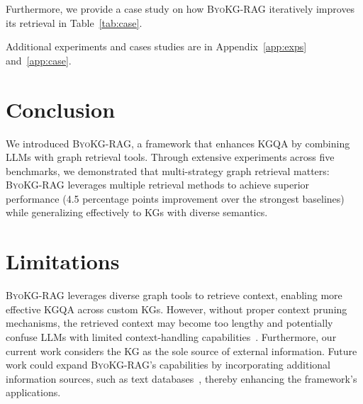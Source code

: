 \documentclass[11pt]{article}
\newcommand{\byokg}{\textsc{ByoKG-RAG}\xspace}
\begin{document}
Furthermore, we provide a case study on how \byokg iteratively improves its retrieval in Table~\ref{tab:case}. 

Additional experiments and cases studies are in Appendix~\ref{app:exps} and~\ref{app:case}.



\section{Conclusion}

We introduced \byokg, a framework that enhances KGQA by combining LLMs with graph retrieval tools. Through extensive experiments across five benchmarks, we demonstrated that multi-strategy graph retrieval matters: \byokg leverages multiple retrieval methods to achieve superior performance (4.5 percentage points improvement over the strongest baselines) while generalizing effectively to KGs with diverse semantics. 



\section*{Limitations}

\byokg leverages diverse graph tools to retrieve context, enabling more effective KGQA across custom KGs. However, without proper context pruning mechanisms, the retrieved context may become too lengthy and potentially confuse LLMs with limited context-handling capabilities~\citep{liu2023lost}. Furthermore, our current work considers the KG as the sole source of external information. Future work could expand \byokg's capabilities by incorporating additional information sources, such as text databases~\citep{wu2024stark}, thereby enhancing the framework's applications.








\end{document}
